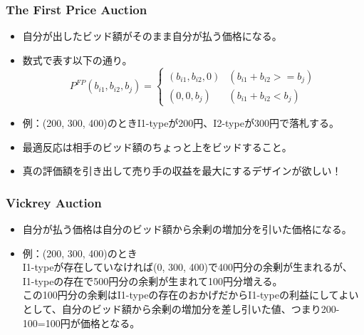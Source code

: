 \documentclass[dvipdfmx,12pt]{beamer}
\begin{document}
\begin{frame}
\frametitle{The First Price Auction}
\begin{itemize}\setlength{\parskip}{0.5em}
\item
自分が出したビッド額がそのまま自分が払う価格になる。\pause
\item
数式で表す以下の通り。
\begin{equation}
P^{FP}(b_{i1}, b_{i2}, b_{j}) = \begin{cases}
    (b_{i1}, b_{i2}, 0) & (b_{i1} + b_{i2} >= b_{j}) \\
    (0, 0, b_{j}) & (b_{i1} + b_{i2} < b_{j})
  \end{cases}
\end{equation}\pause
\item
例：(200, 300, 400)のときI1-typeが200円、I2-typeが300円で落札する。\pause
\item
最適反応は相手のビッド額のちょっと上をビッドすること。\pause
\item
真の評価額を引き出して売り手の収益を最大にするデザインが欲しい！
\end{itemize}
\end{frame}

\begin{frame}
\frametitle{Vickrey Auction}
\begin{itemize}\setlength{\parskip}{0.5em}
\item
自分が払う価格は自分のビッド額から余剰の増加分を引いた価格になる。\pause
\item
例：(200, 300, 400)のとき\\
I1-typeが存在していなければ(0, 300, 400)で400円分の余剰が生まれるが、\\
I1-typeの存在で500円分の余剰が生まれて100円分増える。\\
この100円分の余剰はI1-typeの存在のおかげだからI1-typeの利益にしてよいとして、自分のビッド額から余剰の増加分を差し引いた値、つまり200-100=100円が価格となる。
\end{itemize}
\end{frame}
\end{document}

